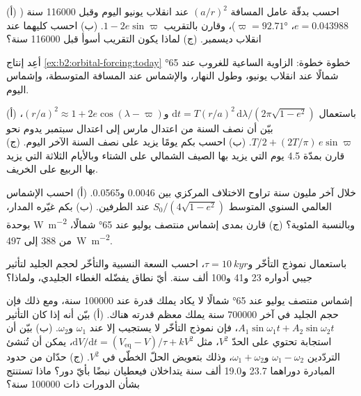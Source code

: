 \begin{exercise}[$\star\star$]\label{exo:b2:orbital-forcing:5}
(أ) احسب بدقّة عامل المسافة $(a/r)^2$ عند انقلاب يونيو اليوم وقبل \num{116000} سنة
($e = 0.043988$، $\varpi = \ang{92.71}$)، وقارن بالتقريب $1 -
2e\sin\varpi$. (ب) احسب كليهما عند انقلاب ديسمبر. (ج) لماذا يكون التقريب أسوأ قبل \num{116000}
سنة؟
\end{exercise}

\begin{exercise}[$\star\star$]\label{exo:b2:orbital-forcing:6}
أعِد إنتاج \cref{ex:b2:orbital-forcing:today} خطوة خطوة: الزاوية الساعية للغروب عند \ang{65} شمالًا
عند انقلاب يونيو، وطول النهار، والإشماس عند المسافة المتوسطة،
وإشماس اليوم.
\end{exercise}

\begin{exercise}[$\star\star$]\label{exo:b2:orbital-forcing:7}
(أ) باستعمال $\mathrm dt = T(r/a)^2\,\mathrm d\lambda/(2\pi\sqrt{1 - e^2})$ و$(r/a)^2 \approx 1 +
2e\cos(\lambda - \varpi)$، بيّن أن نصف السنة من اعتدال مارس إلى اعتدال سبتمبر يدوم
نحو $T/2 + (2T/\pi)\,e\sin\varpi$. (ب) احسب بكم يومًا يزيد على نصف السنة الآخر
اليوم. (ج) قارن بمدّة 4.5 يوم التي يزيد بها الصيف الشمالي على الشتاء وبالأيام الثلاثة التي
يزيد بها الربيع على الخريف.
\end{exercise}

\begin{exercise}[$\star\star$]\label{exo:b2:orbital-forcing:8}
خلال آخر مليون سنة تراوح الاختلاف المركزي بين \num{0.0046} و\num{0.0565}. (أ) احسب
الإشماس العالمي السنوي المتوسط $S_0/(4\sqrt{1 - e^2})$ عند الطرفين. (ب) بكم غيّره المدار،
بوحدة \unit{W.m^{-2}} وبالنسبة المئوية؟ (ج) قارن بمدى إشماس
منتصف يوليو عند \ang{65} شمالًا، من 388 إلى \qty{497}{W.m^{-2}}.
\end{exercise}

\begin{exercise}[$\star\star$]\label{exo:b2:orbital-forcing:9}
باستعمال نموذج التأخّر و$\tau = \qty{10}{kyr}$، احسب السعة النسبية والتأخّر لحجم
الجليد لتأثير جيبي أدواره 23 و41 و\num{100} ألف سنة. أيّ نطاق يفضّله
الغطاء الجليدي، ولماذا؟
\end{exercise}

\begin{exercise}[$\star\star\star$]\label{exo:b2:orbital-forcing:10}
إشماس منتصف يوليو عند \ang{65} شمالًا لا يكاد يملك قدرة عند \num{100000} سنة، ومع ذلك فإن حجم الجليد
في آخر \num{700000} سنة يملك معظم قدرته هناك. (أ) بيّن أنه إذا كان التأثير $A_1\sin
\omega_1 t + A_2\sin\omega_2 t$، فإن نموذج التأخّر لا يستجيب إلا عند $\omega_1$ و$\omega_2$. (ب) بيّن
أن استجابة تحتوي على الحدّ $V^2$، مثل $\mathrm dV/\mathrm dt = (V_{\mathrm{eq}} -
V)/\tau + kV^2$، يمكن أن تُنشئ التردّدين $\omega_1 - \omega_2$ و$\omega_1 + \omega_2$، وذلك
بتعويض الحلّ الخطّي في $V^2$. (ج) حدّان من حدود المبادرة دوراهما \num{23.7}
و\num{19.0} ألف سنة يتداخلان فيعطيان نبضًا بأيّ دور؟ ماذا تستنتج بشأن الدورات ذات
\num{100000} سنة؟
\end{exercise}

